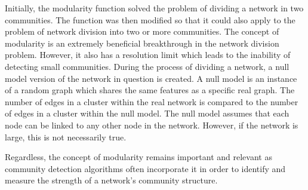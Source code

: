 Initially, the modularity function solved the problem of dividing a network in two communities. The function was then modified so that it could also apply to the problem of network division into two or more communities. The concept of modularity is an extremely beneficial breakthrough in the network division problem. However, it also has a resolution limit which leads to the inability of detecting small communities. During the process of dividing a network, a null model version of the network in question is created. A null model is an instance of a random graph which shares the same features as a specific real graph. The number of edges in a cluster within the real network is compared to the number of edges in a cluster within the null model. The null model assumes that each node can be linked to any other node in the network. However, if the network is large, this is not necessarily true. 

Regardless, the concept of modularity remains important and relevant as community detection algorithms often incorporate it in order to identify and measure the strength of a network's community structure.

\iffalse
\section{Network Science}

Network science is an academic field focusing on the analysis and study of complex networks including telecommunication, computer, biological and social networks. The field combines theories and methods with origins in mathematics, physics, computer science and sociology such as graph theory, statistical inference, data mining and information visualisation and social structure.

Moreover, the research field of network science is composed by a large number of specific studies that focus their purpose on a certain aspect of network science including network theory and analysis.
\fi

\iffalse
\subsection{Network Theory}

Network Theory is part of graph theory and studies networks as graphs comprised of nodes connected by either directed (asymmetric) or undirected (symmetric) edges. Network Theory is employed in various other fields such as computer science, electrical engineering, biology and economics.
\fi

